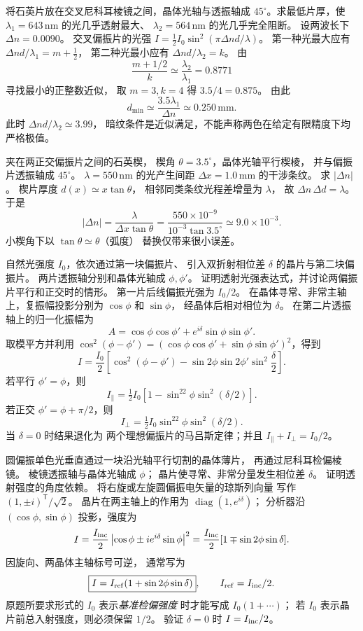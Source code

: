 将石英片放在交叉尼科耳棱镜之间，晶体光轴与透振轴成
$45^\circ$。求最低片厚，使
$\lambda_1=643\,\mathrm{nm}$ 的光几乎透射最大、
$\lambda_2=564\,\mathrm{nm}$ 的光几乎完全阻断。
设两波长下 $\Delta n=0.0090$。
\exsolution
交叉偏振片的光强
$I=\tfrac12 I_0\sin^2(\pi\Delta nd/\lambda)$。
第一种光最大应有
$\Delta nd/\lambda_1=m+\tfrac12$，
第二种光最小应有
$\Delta nd/\lambda_2=k$。
由
\[
 \frac{m+1/2}{k}\simeq\frac{\lambda_2}{\lambda_1}
 =0.8771
\]
寻找最小的正整数近似，
取 $m=3,k=4$ 得 $3.5/4=0.875$。
由此
\[
 \boxed{d_{\min}\simeq\frac{3.5\lambda_1}{\Delta n}
 \simeq0.250\,\mathrm{mm}}.
\]
\excheck 此时 $\Delta nd/\lambda_2\simeq3.99$，
暗纹条件是近似满足，不能声称两色在给定有限精度下均严格极值。

夹在两正交偏振片之间的石英楔，
楔角 $\theta=3.5^\circ$，晶体光轴平行楔棱，
并与偏振片透振轴成 $45^\circ$。
$\lambda=550\,\mathrm{nm}$ 的光产生间距
$\Delta x=1.0\,\mathrm{mm}$ 的干涉条纹。
求 $|\Delta n|$。
\exsolution
楔片厚度 $d(x)\simeq x\tan\theta$，
相邻同类条纹光程差增量为 $\lambda$，
故 $\Delta n\,\Delta d=\lambda$。
于是
\[
 \boxed{|\Delta n|=
 \frac{\lambda}{\Delta x\tan\theta}
 =\frac{550\times10^{-9}}
 {10^{-3}\tan3.5^\circ}
 \simeq9.0\times10^{-3}}.
\]
\excheck 小楔角下以 $\tan\theta\simeq\theta$（弧度）
替换仅带来很小误差。

自然光强度 $I_0$，依次通过第一块偏振片、
引入双折射相位差 $\delta$ 的晶片与第二块偏振片。
两片透振轴分别和晶体光轴成 $\phi,\phi'$。
证明透射光强表达式，并讨论两偏振片平行和正交时的情形。
\exsolution
第一片后线偏振光强为 $I_0/2$。
在晶体寻常、非常主轴上，复振幅投影分别为
$\cos\phi$ 和 $\sin\phi$，
经晶体后相对相位为 $\delta$。
在第二片透振轴上的归一化振幅为
\[
 A=\cos\phi\cos\phi'
 +e^{i\delta}\sin\phi\sin\phi'.
\]
取模平方并利用
$\cos^2(\phi-\phi')
=(\cos\phi\cos\phi'+\sin\phi\sin\phi')^2$，得到
\[
 \boxed{I=\frac{I_0}{2}
 \left[\cos^2(\phi-\phi')
 -\sin2\phi\sin2\phi'\sin^2\frac\delta2\right]}.
\]
若平行 $\phi'=\phi$，则
\[
 \boxed{I_{\parallel}=\tfrac12 I_0
 [1-\sin^22\phi\sin^2(\delta/2)]}.
\]
若正交 $\phi'=\phi+\pi/2$，则
\[
 \boxed{I_{\perp}=\tfrac12 I_0
 \sin^22\phi\sin^2(\delta/2)}.
\]
\excheck 当 $\delta=0$ 时结果退化为
两个理想偏振片的马吕斯定律；并且
$I_{\parallel}+I_\perp=I_0/2$。

圆偏振单色光垂直通过一块沿光轴平行切割的晶体薄片，
再通过尼科耳检偏棱镜。
棱镜透振轴与晶体光轴成 $\phi$；
晶片使寻常、非常分量发生相位差 $\delta$。
证明透射强度的角度依赖。
\exsolution
将右旋或左旋圆偏振电矢量的琼斯列向量
写作 $(1,\pm i)^{\mathsf T}/\sqrt2$。
晶片在两主轴上的作用为
$\operatorname{diag}(1,e^{i\delta})$；
分析器沿 $(\cos\phi,\sin\phi)$ 投影，强度为
\[
 I=\frac{I_{\rm inc}}2
 \left|\cos\phi\pm i e^{i\delta}\sin\phi\right|^2
 =\frac{I_{\rm inc}}2[1\mp\sin2\phi\sin\delta].
\]
因旋向、两晶体主轴标号可逆，
通常写为
\[
 \boxed{I=I_{\rm ref}(1+\sin2\phi\sin\delta)},
 \qquad I_{\rm ref}=I_{\rm inc}/2.
\]
\excheck 原题所要求形式的 $I_0$ 表示\emph{基准检偏强度}
时才能写成 $I_0(1+\cdots)$；
若 $I_0$ 表示晶片前总入射强度，则必须保留 $1/2$。
验证 $\delta=0$ 时 $I=I_{\rm inc}/2$。

